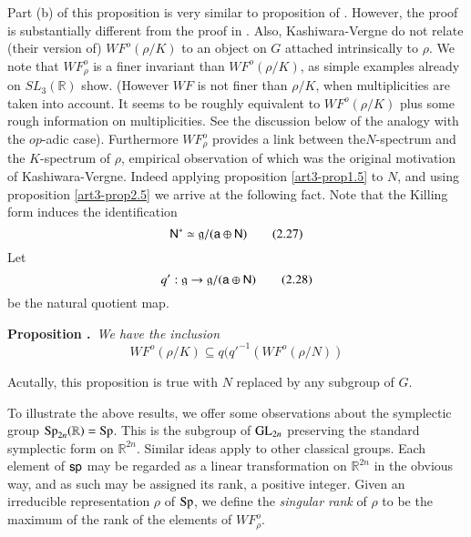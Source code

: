 \begin{remark*}
Part (b) of this proposition is very similar to proposition of \cite{art3-KV}. However, the proof is substantially different from the proof in \cite{art3-KV}. Also, Kashiwara-Vergne do not relate (their version of) $WF^{o}(\rho/K)$ to an object on $G$ attached intrinsically to $\rho$. We note that $WF^{o}_{\rho}$ is a finer invariant than $WF^{o}(\rho/K)$, as simple examples already on $SL_{3}(\mathbb{R})$ show. (However $WF$ is not finer than $\rho/K$, when multiplicities are taken into account. It seems to be roughly equivalent to $WF^{o}(\rho/K)$ plus some rough information on multiplicities. See the discussion below of the analogy with the $op$-adic case). Furthermore $WF^{o}_{\rho}$ provides a link between the\pageoriginale $N$-spectrum and the $K$-spectrum of $\rho$, empirical observation of which was the original motivation of Kashiwara-Vergne. Indeed applying proposition \ref{art3-prop1.5} to $N$, and using proposition \ref{art3-prop2.5} we arrive at the following fact. Note that the Killing form induces the identification
\begin{equation*}
\mathsf{N}^{*}\simeq \mathfrak{g}/(\mathsf{a}\oplus \mathsf{N})\tag{2.27}\label{art3-eq2.27}
\end{equation*}
Let
\begin{equation*}
q':\mathfrak{g}\to \mathfrak{g}/(\mathsf{a}\oplus \mathsf{N})\tag{2.28}\label{art3-eq2.28}
\end{equation*}
be the natural quotient map.
\end{remark*}

\medskip
\noindent
{\bf Proposition .\label{art3-prop2.6}}~{\em We have the inclusion}
\begin{equation*}
WF^{o}(\rho/K)\subseteq q({q'}^{-1}(WF^{o}(\rho/N))\tag{2.29}\label{art3-eq2.29}
\end{equation*}

Acutally, this proposition is true with $N$ replaced by any subgroup of $G$. 

To illustrate the above results, we offer some observations about the symplectic group $\operatorname{Sp}_{2n}(\mathbb{R})=\operatorname{Sp}$. This is the subgroup of $\mathrm{GL}_{2n}$ preserving the standard symplectic form on $\mathbb{R}^{2n}$. Similar ideas apply to other classical groups. Each element of $\mathsf{s}\mathsf{p}$ may be regarded as a linear transformation on $\mathbb{R}^{2n}$ in the obvious way, and as such may be assigned its rank, a positive integer. Given an irreducible representation $\rho$ of $\operatorname{Sp}$, we define the {\em singular rank} of $\rho$ to be the maximum of the rank of the elements of $WF^{o}_{\rho}$.

